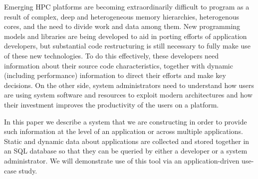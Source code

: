 Emerging HPC platforms are becoming extraordinarily difficult to program as a result of complex, deep  and heterogeneous memory hierarchies, heterogenous cores, and the need to divide work and data among them.
New programming models and libraries are being developed to aid in porting efforts of application developers, but substantial code restructuring is still necessary to fully make use of these new technologies.
To do this effectively, these developers need information about their source code characteristics, together with dynamic (including performance) information to direct their efforts and make key decisions.
On the other side, system administrators need to understand how users are using system software and resources to exploit modern architectures and how their investment improves the productivity of the users on a platform.

In this paper we describe a system that we are constructing in order to provide such information at the level of an application or across multiple applications.
Static and dynamic data about applications are collected and stored together in an \acs{SQL} database so that they can be queried by either a developer or a system administrator.
We will demonstrate use of this tool via an application-driven use-case study.
